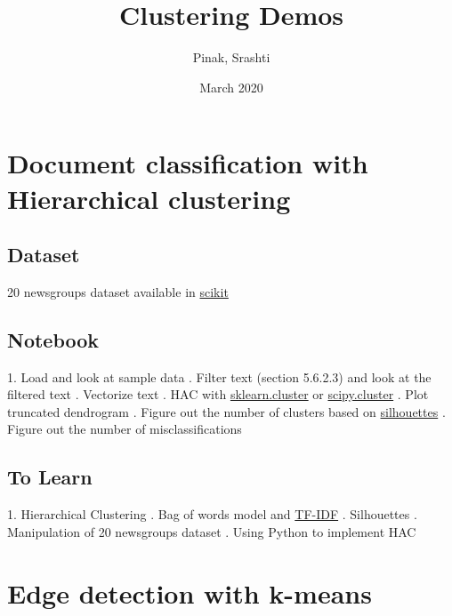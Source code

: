 \documentclass{article}
\title{Clustering Demos}
\author{Pinak, Srashti }
\date{March 2020}
\begin{document}
\maketitle

\section*{Document classification with Hierarchical clustering}
\subsection*{Dataset}
20 newsgroups dataset available in  \href{https://scikit-learn.org/0.19/datasets/twenty_newsgroups.html}{scikit}
\subsection*{Notebook}
1. Load and look at sample data
. Filter text (section 5.6.2.3) and look at the filtered text
. Vectorize text
. HAC with \href{https://scikit-learn.org/stable/modules/generated/sklearn.cluster.AgglomerativeClustering.html}{sklearn.cluster} or \href{https://joernhees.de/blog/2015/08/26/scipy-hierarchical-clustering-and-dendrogram-tutorial/}{scipy.cluster}
. Plot truncated dendrogram
. Figure out the number of clusters based on \href{https://en.wikipedia.org/wiki/Silhouette_(clustering)}{silhouettes}
. Figure out the number of misclassifications
\subsection*{To Learn}
1. Hierarchical Clustering
. Bag of words model and \href{https://towardsdatascience.com/natural-language-processing-feature-engineering-using-tf-idf-e8b9d00e7e76}{TF-IDF}
. Silhouettes
. Manipulation of 20 newsgroups dataset
. Using Python to implement HAC
\section*{Edge detection with k-means}
\end{document}
